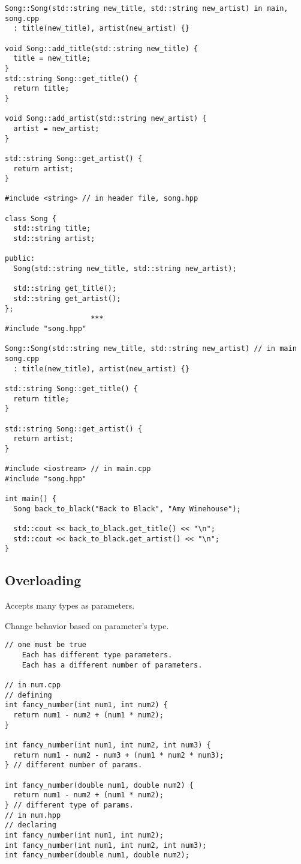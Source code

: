 \begin{verbatim}
Song::Song(std::string new_title, std::string new_artist) in main, song.cpp
  : title(new_title), artist(new_artist) {}

void Song::add_title(std::string new_title) {
  title = new_title;
}
std::string Song::get_title() {
  return title;
}

void Song::add_artist(std::string new_artist) {
  artist = new_artist;
}

std::string Song::get_artist() {
  return artist;
}

#include <string> // in header file, song.hpp

class Song {
  std::string title;
  std::string artist;

public:
  Song(std::string new_title, std::string new_artist);

  std::string get_title();
  std::string get_artist();
};
                    ***
#include "song.hpp"

Song::Song(std::string new_title, std::string new_artist) // in main song.cpp
  : title(new_title), artist(new_artist) {}

std::string Song::get_title() {
  return title;
}

std::string Song::get_artist() {
  return artist;
}

#include <iostream> // in main.cpp
#include "song.hpp"

int main() { 
  Song back_to_black("Back to Black", "Amy Winehouse");

  std::cout << back_to_black.get_title() << "\n";
  std::cout << back_to_black.get_artist() << "\n";
}
\end{verbatim}

\subsection{Overloading}

Accepts many types as parameters.

Change behavior based on parameter's type.

\begin{verbatim}
// one must be true
    Each has different type parameters.
    Each has a different number of parameters.
    
// in num.cpp 
// defining
int fancy_number(int num1, int num2) {
  return num1 - num2 + (num1 * num2);
}

int fancy_number(int num1, int num2, int num3) {
  return num1 - num2 - num3 + (num1 * num2 * num3);
} // different number of params.

int fancy_number(double num1, double num2) {
  return num1 - num2 + (num1 * num2);
} // different type of params.
// in num.hpp
// declaring
int fancy_number(int num1, int num2);
int fancy_number(int num1, int num2, int num3);
int fancy_number(double num1, double num2);

\end{verbatim}

